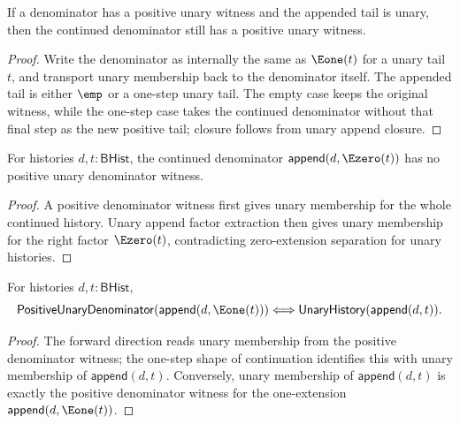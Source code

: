 \begin{theorem}
\label{thm:rat-positive-denominator-append-unary-tail}
If a denominator has a positive unary witness and the appended tail is unary, then the continued denominator still has a positive unary witness.
\end{theorem}
\begin{proof}
Write the denominator as internally the same as \(\Eone(t)\) for a unary tail \(t\), and transport unary membership back to the denominator itself. The appended tail is either \(\emp\) or a one-step unary tail. The empty case keeps the original witness, while the one-step case takes the continued denominator without that final step as the new positive tail; closure follows from unary append closure.
\end{proof}

\begin{theorem}
\label{thm:positive-unary-denominator-append-e0-tail-absurd}
For histories $d,t:\mathsf{BHist}$, the continued denominator
$\mathsf{append}(d,\Ezero(t))$ has no positive unary denominator witness.
\end{theorem}
\begin{proof}
A positive denominator witness first gives unary membership for the whole
continued history. Unary append factor extraction then gives unary membership
for the right factor $\Ezero(t)$, contradicting zero-extension separation for
unary histories.
\end{proof}

\begin{theorem}
\label{thm:positive-unary-denominator-append-e1-tail-iff-unary-append}
For histories $d,t:\mathsf{BHist}$,
$$
\mathsf{PositiveUnaryDenominator}(\mathsf{append}(d,\Eone(t)))
\Longleftrightarrow
\mathsf{UnaryHistory}(\mathsf{append}(d,t)).
$$
\end{theorem}
\begin{proof}
The forward direction reads unary membership from the positive denominator
witness; the one-step shape of continuation identifies this with unary
membership of $\mathsf{append}(d,t)$. Conversely, unary membership of
$\mathsf{append}(d,t)$ is exactly the positive denominator witness for the
one-extension $\mathsf{append}(d,\Eone(t))$.
\end{proof}

